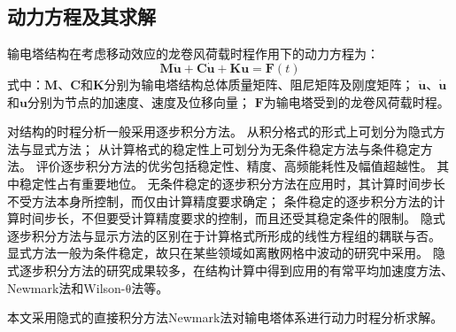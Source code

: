 \subsection{动力方程及其求解}

输电塔结构在考虑移动效应的龙卷风荷载时程作用下的动力方程为：
\begin{equation}\label{eqn:dynamic}
    \bm{M}\ddot{\bm{u}}+\bm{C}\dot{\bm{u}}+\bm{K}\bm{u} = \bm{F}(t)
\end{equation}
式中：$\bm{M}$、$\bm{C}$和$\bm{K}$分别为输电塔结构总体质量矩阵、阻尼矩阵及刚度矩阵；
$\ddot{\bm{u}}$、$\dot{\bm{u}}$和$\bm{u}$分别为节点的加速度、速度及位移向量；
$\bm{F}$为输电塔受到的龙卷风荷载时程。

对结构的时程分析一般采用逐步积分方法。
从积分格式的形式上可划分为隐式方法与显式方法；
从计算格式的稳定性上可划分为无条件稳定方法与条件稳定方法。
评价逐步积分方法的优劣包括稳定性、精度、高频能耗性及幅值超越性。
其中稳定性占有重要地位。
无条件稳定的逐步积分方法在应用时，其计算时间步长不受方法本身所控制，而仅由计算精度要求确定；
条件稳定的逐步积分方法的计算时间步长，不但要受计算精度要求的控制，而且还受其稳定条件的限制。
隐式逐步积分方法与显示方法的区别在于计算格式所形成的线性方程组的耦联与否。
显式方法一般为条件稳定，故只在某些领域如离散网格中波动的研究中采用。
隐式逐步积分方法的研究成果较多，在结构计算中得到应用的有常平均加速度方法、Newmark法和Wilson-$\mathrm{\theta}$法等。

本文采用隐式的直接积分方法Newmark法对输电塔体系进行动力时程分析求解。

